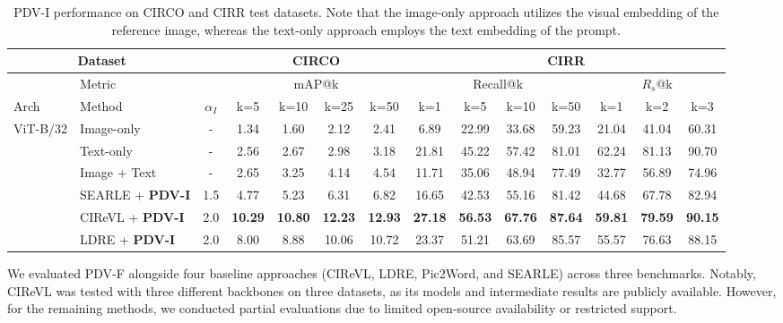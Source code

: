 \begin{table*}
	\centering
	\footnotesize
	\setlength{\tabcolsep}{4pt}
	\begin{tabular}{l|l|c|cccc|cccc|ccc}
		\hline
		\multicolumn{2}{c|}{\textbf{Dataset}} & & \multicolumn{4}{c|}{\textbf{CIRCO}} & \multicolumn{7}{c}{\textbf{CIRR}} \\
		\hline
		& Metric & & \multicolumn{4}{c|}{mAP@k} & \multicolumn{4}{c|}{Recall@k} & \multicolumn{3}{c}{$R_s$@k} \\
		\cline{2-14}
		Arch & Method & $\alpha_I$ & k=5 & k=10 & k=25 & k=50 & k=1 & k=5 & k=10 & k=50 & k=1 & k=2 & k=3 \\
		\hline
		\multirow{6}{*}{ViT-B/32} 
		& Image-only \textdagger & - & 1.34 & 1.60 & 2.12 & 2.41 & 6.89 & 22.99 & 33.68 & 59.23 & 21.04 & 41.04 & 60.31 \\
		& Text-only \textdagger & - & 2.56 & 2.67 & 2.98 & 3.18 & 21.81 & 45.22 & 57.42 & 81.01 & 62.24 & 81.13 & 90.70 \\
		& Image + Text \textdagger & - & 2.65 & 3.25 & 4.14 & 4.54 & 11.71 & 35.06 & 48.94 & 77.49 & 32.77 & 56.89 & 74.96 \\
		& SEARLE + \textbf{PDV-I} & 1.5 & 4.77 & 5.23  & 6.31 & 6.82 & 16.65 & 42.53 & 55.16 & 81.42 & 44.68 & 67.78 & 82.94\\
		& CIReVL + \textbf{PDV-I} & 2.0 & \textbf{10.29 }& \textbf{10.80} & \textbf{12.23} & \textbf{12.93} & \textbf{27.18} & \textbf{56.53} & \textbf{67.76} & \textbf{87.64} & \textbf{59.81} & \textbf{79.59} & \textbf{90.15}\\
		& LDRE + \textbf{PDV-I} & 2.0 & 8.00 & 8.88 & 10.06 & 10.72 & 23.37 & 51.21 & 63.69 & 85.57 & 55.57 & 76.63 & 88.15\\
		\hline
	\end{tabular}
	\caption{PDV-I performance on CIRCO and CIRR test datasets. Note that the image-only approach utilizes the visual embedding of the reference image, whereas the text-only approach employs the text embedding of the prompt.}
	\label{tab:circo_cirr_results_pdv-I}
\end{table*}

We evaluated PDV-F alongside four baseline approaches (CIReVL, LDRE, Pic2Word, and SEARLE) across three benchmarks. Notably, CIReVL was tested with three different backbones on three datasets, as its models and intermediate results are publicly available. However, for the remaining methods, we conducted partial evaluations due to limited open-source availability or restricted support.

